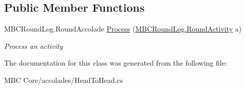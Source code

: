 \subsection*{Public Member Functions}
\begin{DoxyCompactItemize}
\item 
\hypertarget{class_m_b_c_core_1_1mbc_1_1accolades_1_1_head_to_head_a951413ce16e7ef7c97498343c8d3a4c3}{M\-B\-C\-Round\-Log.\-Round\-Accolade \hyperlink{class_m_b_c_core_1_1mbc_1_1accolades_1_1_head_to_head_a951413ce16e7ef7c97498343c8d3a4c3}{Process} (\hyperlink{class_m_b_c_core_1_1_m_b_c_round_log_1_1_round_activity}{M\-B\-C\-Round\-Log.\-Round\-Activity} a)}\label{class_m_b_c_core_1_1mbc_1_1accolades_1_1_head_to_head_a951413ce16e7ef7c97498343c8d3a4c3}

\begin{DoxyCompactList}\small\item\em Process an activity\end{DoxyCompactList}\end{DoxyCompactItemize}


The documentation for this class was generated from the following file\-:\begin{DoxyCompactItemize}
\item 
M\-B\-C Core/accolades/Head\-To\-Head.\-cs\end{DoxyCompactItemize}

